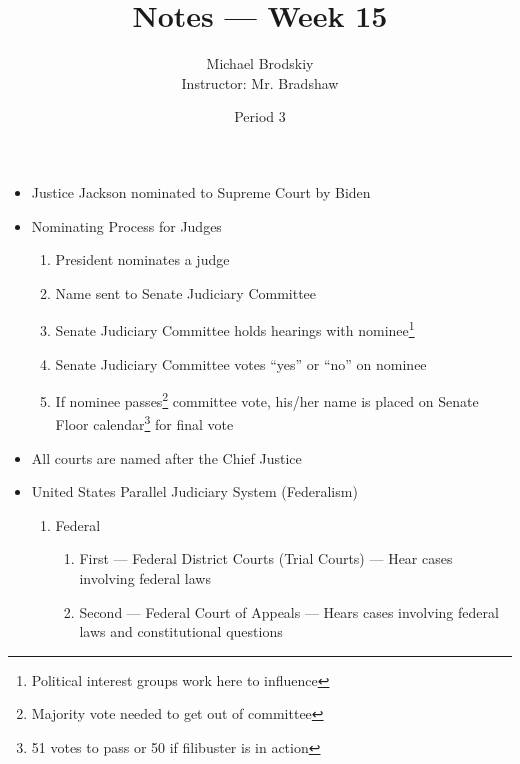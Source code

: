 \documentclass[12pt]{article}
\title{Notes — Week 15}
\date{Period 3}
\author{Michael Brodskiy\\ \small Instructor: Mr. Bradshaw}
\begin{document}
\maketitle

\begin{itemize}

  \item Justice Jackson nominated to Supreme Court by Biden

  \item Nominating Process for Judges

    \begin{enumerate}

      \item President nominates a judge

      \item Name sent to Senate Judiciary Committee

      \item Senate Judiciary Committee holds hearings with nominee\footnote{Political interest groups work here to influence}

      \item Senate Judiciary Committee votes “yes” or “no” on nominee

      \item If nominee passes\footnote{Majority vote needed to get out of committee} committee vote, his/her name is placed on Senate Floor calendar\footnote{51 votes to pass or 50 if filibuster is in action} for final vote

    \end{enumerate}

  \item All courts are named after the Chief Justice

  \item United States Parallel Judiciary System (Federalism)

    \begin{enumerate}

      \item Federal

        \begin{enumerate}

          \item First — Federal District Courts (Trial Courts) — Hear cases involving federal laws

          \item Second — Federal Court of Appeals — Hears cases involving federal laws and constitutional questions


\end{enumerate}
\end{enumerate}
\end{itemize}
\end{document}
